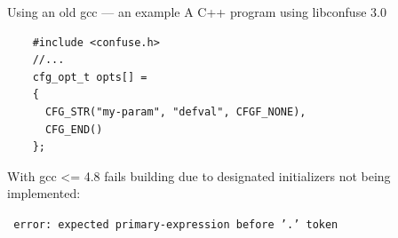 \documentclass[xetex,table,aspectratio=169]{beamer}
\begin{document}
\begin{frame}[fragile]{Using an old gcc --- an example}
  A C++ program using libconfuse 3.0

  \begin{verbatim}
    #include <confuse.h>
    //...
    cfg_opt_t opts[] =
    {
      CFG_STR("my-param", "defval", CFGF_NONE),
      CFG_END()
    };
  \end{verbatim}

  With gcc <= 4.8 fails building due to designated initializers not being implemented:

  \texttt{ error: expected primary-expression before '.' token}
\end{frame}
\end{document}
